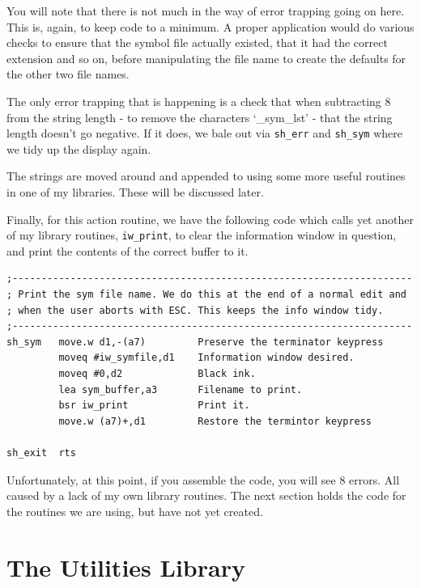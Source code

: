 \begin{note}
You will note that there is not much in the way of error trapping
      going on here. This is, again, to keep code to a minimum. A proper
      application would do various checks to ensure that the symbol file
      actually existed, that it had the correct extension and so on, before
      manipulating the file name to create the defaults for the other two file
      names.

The only error trapping that is happening is a check that when
      subtracting 8 from the string length -{} to remove the characters
      `\_sym\_lst' -{} that the string length doesn't go negative. If it does, we
      bale out via \texttt{sh\_err} and \texttt{sh\_sym}       where we tidy up the display again.
\end{note}

The strings are moved around and appended to using some more useful
    routines in one of my libraries. These will be discussed later.

Finally, for this action routine, we have the following code which
    calls yet another of my library routines, \texttt{iw\_print},
    to clear the information window in question, and print the contents of the
    correct buffer to it.

\begin{lstlisting}[firstnumber=1,]
;---------------------------------------------------------------------
; Print the sym file name. We do this at the end of a normal edit and
; when the user aborts with ESC. This keeps the info window tidy.
;---------------------------------------------------------------------
sh_sym   move.w d1,-(a7)         Preserve the terminator keypress
         moveq #iw_symfile,d1    Information window desired.
         moveq #0,d2             Black ink.
         lea sym_buffer,a3       Filename to print.
         bsr iw_print            Print it.
         move.w (a7)+,d1         Restore the termintor keypress

sh_exit  rts
\end{lstlisting}

Unfortunately, at this point, if you assemble the code, you will see
    8 errors. All caused by a lack of my own library routines. The next
    section holds the code for the routines we are using, but have not yet
    created.

\section{The Utilities Library}
\label{ch32-utilities-library}%

